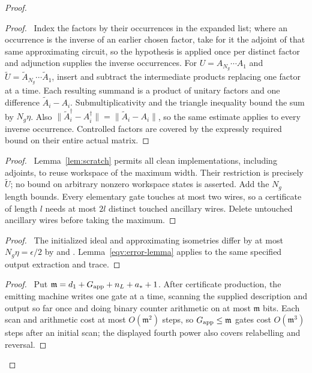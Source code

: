 \begin{proof}
 \begin{proof}\pf\ Index the factors by their occurrences in the expanded list; where an occurrence is the inverse of an earlier chosen factor, take for it the adjoint of that same approximating circuit, so the hypothesis is applied once per distinct factor and adjunction supplies the inverse occurrences. For $U=A_{N_g}\cdots A_1$ and
 $\widetilde U=\widetilde A_{N_g}\cdots\widetilde A_1$, insert and
 subtract the intermediate products replacing one factor at a time.
 Each resulting summand is a product of unitary factors and one
 difference $\widetilde A_i-A_i$. Submultiplicativity and the
 triangle inequality bound the sum by $N_g\eta$.
 Also $\|\widetilde A_i^\dagger-A_i^\dagger\|
 =\|\widetilde A_i-A_i\|$, so the same estimate applies to every
 inverse occurrence. Controlled factors are covered by the expressly
 required bound on their entire actual matrix.\end{proof}
 \begin{proof}\pf\ Lemma~\ref{lem:scratch} permits all clean
 implementations, including adjoints, to reuse workspace of the
 maximum width. Their restriction is precisely $\widetilde U$;
 no bound on arbitrary nonzero workspace states is asserted.
 Add the $N_g$ length bounds. Every elementary gate touches at most
 two wires, so a certificate of length $l$ needs at most $2l$
 distinct touched ancillary wires. Delete untouched ancillary wires
 before taking the maximum.\end{proof}
 \begin{proof}\pf\ The initialized ideal and approximating
 isometries differ by at most $N_g\eta=\epsilon/2$ by
  and .
 Lemma~\ref{eqv:error-lemma} applies to the same specified output
 extraction and trace.\end{proof}
 \begin{proof}\pf\ Put ${\mathfrak m}=d_1+G_{\rm app}+n_L+a_*+1$. After certificate production, the emitting machine writes one gate at a time, scanning the supplied description and output so far once and doing binary counter arithmetic on at most ${\mathfrak m}$ bits. Each scan and arithmetic cost at most $O({\mathfrak m}^2)$ steps, so $G_{\rm app}\le {\mathfrak m}$ gates cost $O({\mathfrak m}^3)$ steps after an initial scan; the displayed fourth power also covers relabelling and reversal.

\end{proof}
\end{proof}
